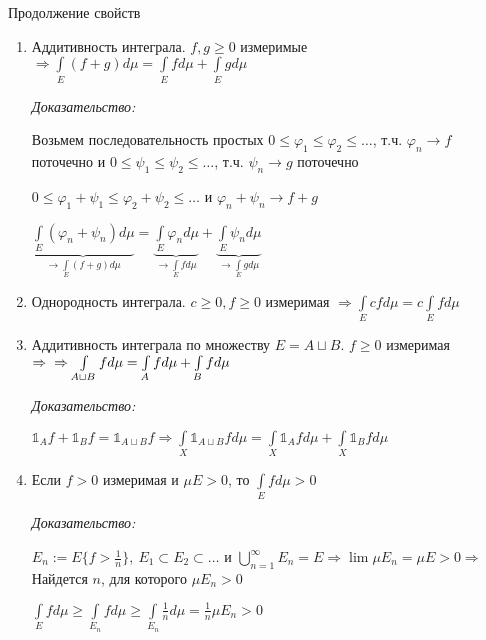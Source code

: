 \documentclass[12pt]{article}
\begin{document}
\begin{theo}{Продолжение свойств}
    \begin{enumerate}[start=5]
        \item Аддитивность интеграла. $f, g \geq 0$ измеримые $\Rightarrow \int\limits_E(f + g)d\mu = \int\limits_E fd\mu + \int\limits_E gd\mu$
        
        \textit{Доказательство:}

        Возьмем последовательность простых $0 \leq \varphi_1 \leq \varphi_2 \leq \ldots$, т.ч. $\varphi_n \to f$ поточечно и $0 \leq \psi_1 \leq \psi_2 \leq \ldots$, т.ч. $\psi_n \to g$ поточечно

        $0 \leq \varphi_1 + \psi_1 \leq \varphi_2 + \psi_2 \leq \ldots$ и $\varphi_n + \psi_n \to f + g$

        $\underbrace{\int\limits_E(\varphi_n + \psi_n)d\mu}_{\to \int\limits_E(f + g)d\mu} = \underbrace{\int\limits_E \varphi_nd\mu}_{\to \int\limits_E fd\mu} + \underbrace{\int\limits_E \psi_nd\mu}_{\to \int\limits_E gd\mu}$

        \item Однородность интеграла. $c \geq 0, f \geq 0$ измеримая $\Rightarrow \int\limits_E cfd\mu = c\int\limits_E fd\mu$
        \item Аддитивность интеграла по множеству $E = A \sqcup B$. $f \geq 0$ измеримая $\Rightarrow \\ \Rightarrow \int\limits_{A \sqcup B} fd\mu = \int\limits_A fd\mu + \int\limits_B fd\mu$
        
        \textit{Доказательство:}

        $\mathbb{1}_A f + \mathbb{1}_B f = \mathbb{1}_{A \sqcup B} f \Rightarrow \int\limits_X \mathbb{1}_{A \sqcup B} fd\mu = \int\limits_X \mathbb{1}_A fd\mu + \int\limits_X \mathbb{1}_B fd\mu$

        \item Если $f > 0$ измеримая и $\mu E > 0$, то $\int\limits_E fd\mu > 0$
        
        \textit{Доказательство:}

        $E_n := E\{f > \frac{1}{n}\},\ E_1 \subset E_2 \subset \ldots$ и $\bigcup\limits_{n = 1}^\infty E_n = E \Rightarrow \lim \mu E_n = \mu E > 0 \Rightarrow$ Найдется $n$, для которого $\mu E_n > 0$
        
        $\int\limits_E fd\mu \geq \int\limits_{E_n} fd\mu \geq \int\limits_{E_n} \frac{1}{n}d\mu = \frac{1}{n}\mu E_n > 0$
    \end{enumerate}
\end{theo}
\end{document}
